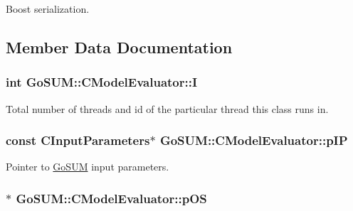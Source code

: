 Boost serialization. 



\subsection{Member Data Documentation}
\hypertarget{class_go_s_u_m_1_1_c_model_evaluator_a1098859defc90ea05ba7223b951d4d3b}{
\subsubsection[{I}]{\setlength{\rightskip}{0pt plus 5cm}int Go\-S\-U\-M\-::\-C\-Model\-Evaluator\-::\-I\hspace{0.3cm}{\ttfamily [protected]}}}\label{class_go_s_u_m_1_1_c_model_evaluator_a1098859defc90ea05ba7223b951d4d3b}
Total number of threads and id of the particular thread this class runs in. \hypertarget{class_go_s_u_m_1_1_c_model_evaluator_a1d6e69bc264c99eda155fe72915fbc8b}{
\subsubsection[{p\-I\-P}]{\setlength{\rightskip}{0pt plus 5cm}const {\bf C\-Input\-Parameters}$\ast$ Go\-S\-U\-M\-::\-C\-Model\-Evaluator\-::p\-I\-P\hspace{0.3cm}{\ttfamily [protected]}}}\label{class_go_s_u_m_1_1_c_model_evaluator_a1d6e69bc264c99eda155fe72915fbc8b}


Pointer to \hyperlink{struct_go_s_u_m}{Go\-S\-U\-M} input parameters. 

\hypertarget{class_go_s_u_m_1_1_c_model_evaluator_a3acd5d24b64c3fbc6b73dad5ea5b9f43}{
\subsubsection[{p\-O\-S}]{$\ast$ Go\-S\-U\-M\-::\-C\-Model\-Evaluator\-::p\-O\-S\hspace{0.3cm}{\ttfamily [protected]}}}\label{class_go_s_u_m_1_1_c_model_evaluator_a3acd5d24b64c3fbc6b73dad5ea5b9f43}


